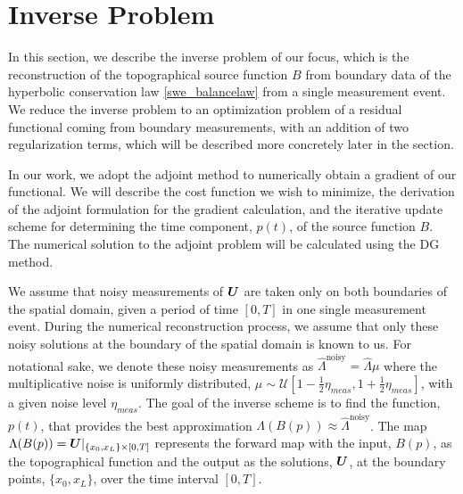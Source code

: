 \section{Inverse Problem} \label{sec_inverse}

In this section, we describe the inverse problem of our focus, which is the reconstruction of the topographical source function $B$ from boundary data of the hyperbolic conservation law \eqref{swe_balancelaw} from a single measurement event.
We reduce the inverse problem to an optimization problem of a residual functional coming from boundary measurements, with an addition of two regularization terms, which will be described more concretely later in the section. 

In our work, we adopt the adjoint method to numerically obtain a gradient of our functional. We will describe the cost function we wish to minimize, the derivation of the adjoint formulation for the gradient calculation, and the iterative update scheme for determining the time component, $p(t)$, of the source function $B$. The numerical solution to the adjoint problem will be calculated using the DG method.

We assume that noisy measurements of $\bm{U}$ are taken only on both boundaries of the spatial domain, given a period of time $[0,T]$ in one single measurement event.
During the numerical reconstruction process, we assume that only these noisy solutions at the boundary of the spatial domain is known to us. For notational sake, we denote these noisy measurements as $\hat{\Lambda}^{\text{noisy}} = \hat{\Lambda}\mu$ where the multiplicative noise is uniformly distributed, $\mu \sim \mathcal{U}\left[1-\frac{1}{2}\eta_{meas},1+\frac{1}{2}\eta_{meas}\right]$, with a given noise level $\eta_{meas}$. The goal of the inverse scheme is to find the function, $p(t)$, that provides the best approximation $\Lambda(B(p)) \approx \hat{\Lambda}^{\text{noisy}}$. The map $\Lambda(B(p))= \bm{U}|_{\{x_0,x_L\} \times [0,T]} $ represents the forward map with the input, $B(p)$, as the topographical function and the output as the solutions, $\bm{U}$, at the boundary points, $\{x_0,x_L\}$, over the time interval $[0,T]$.   

